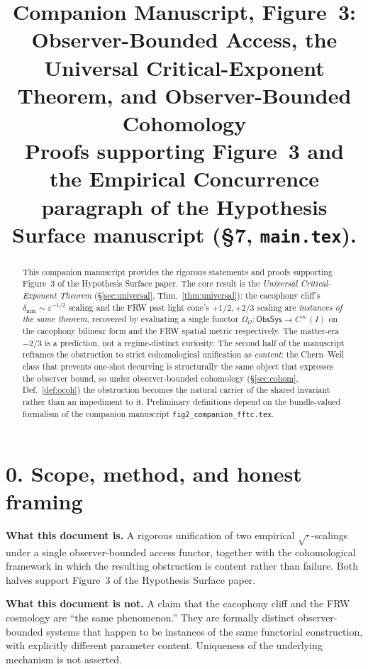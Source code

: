 \documentclass[11pt]{article}
\title{Companion Manuscript, Figure~3: \\
Observer-Bounded Access, the Universal Critical-Exponent
Theorem, and Observer-Bounded Cohomology\\[0.4em]
\large Proofs supporting Figure~3 and the Empirical Concurrence
paragraph of the Hypothesis Surface manuscript (\S7,
\texttt{main.tex}).}
\date{}
\newcommand{\Obs}{\mathcal{O}}
\newcommand{\OmegaO}{\Omega_{\Obs}}
\newcommand{\ObsSys}{\mathsf{ObsSys}}
\begin{document}
\maketitle

\begin{abstract}
\noindent This companion manuscript provides the rigorous
statements and proofs supporting Figure~3 of the Hypothesis
Surface paper. The core result is the
\emph{Universal Critical-Exponent Theorem} (\S\ref{sec:universal},
Thm.~\ref{thm:universal}): the cacophony cliff's
$\delta_{\min} \sim \varepsilon^{-1/2}$ scaling and the FRW past
light cone's $+1/2, +2/3$ scaling are \emph{instances of the same
theorem}, recovered by evaluating a single functor
$\OmegaO:\ObsSys \to C^\infty(I)$ on the cacophony bilinear form
and the FRW spatial metric respectively. The matter-era $-2/3$
is a prediction, not a regime-distinct curiosity.
The second half of the manuscript reframes the obstruction to
strict cohomological unification as \emph{content}: the
Chern--Weil class that prevents one-shot decurving is
structurally the same object that expresses the observer bound,
so under observer-bounded cohomology
(\S\ref{sec:cohom}, Def.~\ref{def:ocoh}) the obstruction becomes
the natural carrier of the shared invariant rather than an
impediment to it. Preliminary definitions depend on the
bundle-valued formalism of the companion manuscript
\texttt{fig2\_companion\_fftc.tex}.
\end{abstract}

\section*{0. Scope, method, and honest framing}
\label{sec:scope}

\noindent\textbf{What this document is.}
A rigorous unification of two empirical $\sqrt{\cdot}$-scalings
under a single observer-bounded access functor, together with
the cohomological framework in which the resulting obstruction is
content rather than failure. Both halves support
Figure~3 of the Hypothesis Surface paper.

\noindent\textbf{What this document is not.}
A claim that the cacophony cliff and the FRW cosmology are
``the same phenomenon.'' They are formally distinct
observer-bounded systems that happen to be instances of the same
functorial construction, with explicitly different parameter
content. Uniqueness of the underlying mechanism is not asserted.
\end{document}
